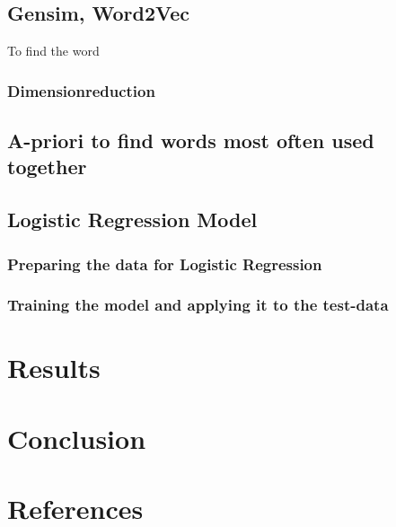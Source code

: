 \documentclass[11pt,a4paper]{article}
\begin{document}
\subsection{Gensim, Word2Vec}
To find the word
\subsubsection{Dimensionreduction}
\subsection{A-priori to find words most often used together}
\subsection{Logistic Regression Model}
\subsubsection{Preparing the data for Logistic Regression}

\subsubsection{Training the model and applying it to the test-data}

\section{Results}
\section{Conclusion}
\section{References}
\end{document}
